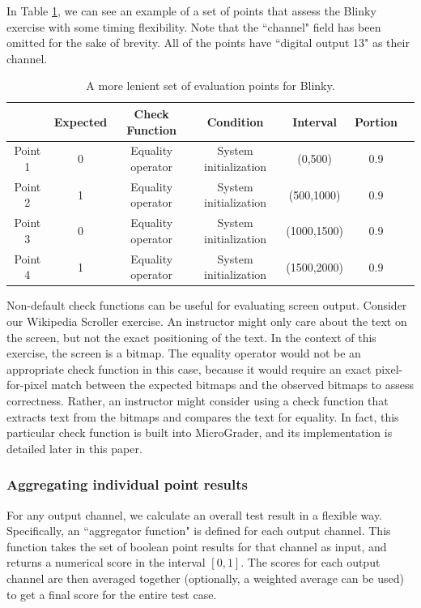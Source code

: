 \documentclass[12pt]{article}
\begin{document}
In Table \ref{table:blinky-lenient-points}, we can see an example of a set of points that assess the Blinky exercise with some timing flexibility.  Note that the ``channel" field has been omitted for the sake of brevity.  All of the points have ``digital output 13" as their channel.

\begin{table}[ht]
\begin{center}
\caption{A more lenient set of evaluation points for Blinky.}
\vspace{2mm}
\label{table:blinky-lenient-points}
\begin{tabular}{c|cccccc}
& Expected & Check Function & Condition & Interval & Portion \\ \hline
Point 1 & 0 & Equality operator & System initialization & (0,500) & 0.9 \\
Point 2 & 1 & Equality operator & System initialization & (500,1000) & 0.9 \\
Point 3 & 0 & Equality operator & System initialization & (1000,1500) & 0.9 \\
Point 4 & 1 & Equality operator & System initialization & (1500,2000) & 0.9 \\ \hline
\end{tabular}
\end{center}
\end{table}

Non-default check functions can be useful for evaluating screen output.  Consider our Wikipedia Scroller exercise.  An instructor might only care about the text on the screen, but not the exact positioning of the text.  In the context of this exercise, the screen is a bitmap.  The equality operator would not be an appropriate check function in this case, because it would require an exact pixel-for-pixel match between the expected bitmaps and the observed bitmaps to assess correctness.  Rather, an instructor might consider using a check function that extracts text from the bitmaps and compares the text for equality.  In fact, this particular check function is built into MicroGrader, and its implementation is detailed later in this paper.

\subsubsection{Aggregating individual point results}
\label{sec:aggregating}
For any output channel, we calculate an overall test result in a flexible way.  Specifically, an ``aggregator function" is defined for each output channel.  This function takes the set of boolean point results for that channel as input, and returns a numerical score in the interval $[0,1]$.  The scores for each output channel are then averaged together (optionally, a weighted average can be used) to get a final score for the entire test case.
\end{document}
